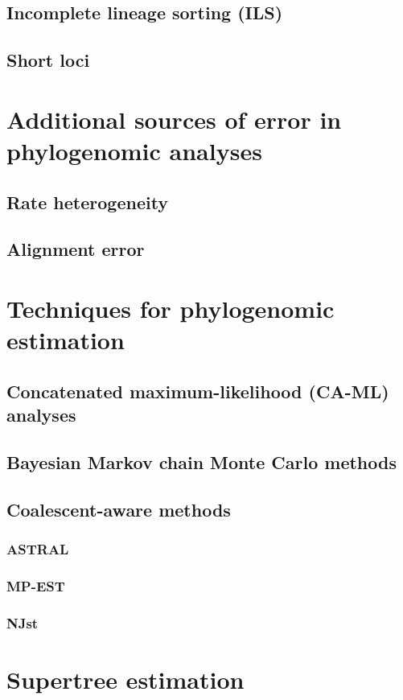 \documentclass[edeposit,fullpage]{uiucthesis2014}
\theoremstyle{definition}
\begin{document}
\subsection{Incomplete lineage sorting (ILS)}
\subsection{Short loci}

\section{Additional sources of error in phylogenomic analyses}
\subsection{Rate heterogeneity}
\subsection{Alignment error}

\section{Techniques for phylogenomic estimation}

\subsection{Concatenated maximum-likelihood (CA-ML) analyses}
\subsection{Bayesian Markov chain Monte Carlo methods}
\subsection{Coalescent-aware methods}
\subsubsection{ASTRAL}
\subsubsection{MP-EST}
\subsubsection{NJst}

\section{Supertree estimation}
\end{document}
